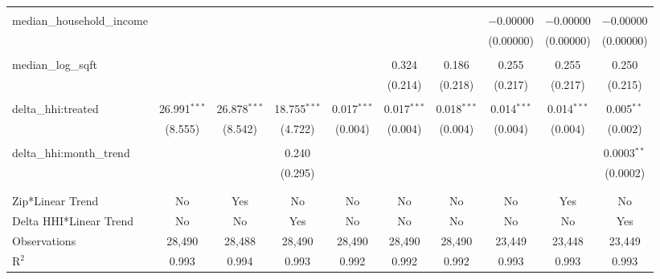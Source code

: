 \begin{table}[H]
{\begin{tabular}{@{\extracolsep{5pt}}lccccccccc}
   & & & & & & & & & \\  

  median\_household\_income &  &  &  &  &  &  & $-$0.00000 & $-$0.00000 & $-$0.00000 \\  

   &  &  &  &  &  &  & (0.00000) & (0.00000) & (0.00000) \\  

   & & & & & & & & & \\  

  median\_log\_sqft &  &  &  &  & 0.324 & 0.186 & 0.255 & 0.255 & 0.250 \\  

   &  &  &  &  & (0.214) & (0.218) & (0.217) & (0.217) & (0.215) \\  

   & & & & & & & & & \\  

  delta\_hhi:treated & 26.991$^{***}$ & 26.878$^{***}$ & 18.755$^{***}$ & 0.017$^{***}$ & 0.017$^{***}$ & 0.018$^{***}$ & 0.014$^{***}$ & 0.014$^{***}$ & 0.005$^{**}$ \\  

   & (8.555) & (8.542) & (4.722) & (0.004) & (0.004) & (0.004) & (0.004) & (0.004) & (0.002) \\  

   & & & & & & & & & \\  

  delta\_hhi:month\_trend &  &  & 0.240 &  &  &  &  &  & 0.0003$^{**}$ \\  

   &  &  & (0.295) &  &  &  &  &  & (0.0002) \\  

   & & & & & & & & & \\  

 \hline \\[-1.8ex]  

 Zip*Linear Trend & No & Yes & No & No & No & No & No & Yes & No \\  

 Delta HHI*Linear Trend & No & No & Yes & No & No & No & No & No & Yes \\  

 Observations & 28,490 & 28,488 & 28,490 & 28,490 & 28,490 & 28,490 & 23,449 & 23,448 & 23,449 \\  

 R$^{2}$ & 0.993 & 0.994 & 0.993 & 0.992 & 0.992 & 0.992 & 0.993 & 0.993 & 0.993 \\  


\end{tabular}}
\end{table}

